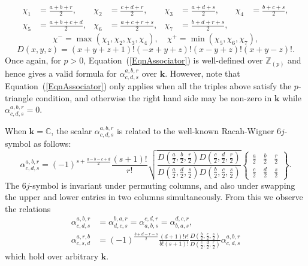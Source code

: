 \documentclass[11pt,a4paper,reqno]{amsart}
\theoremstyle{definition}
\newcommand{\bk}{\mathbf{k}}
\numberwithin{equation}{section}
\newcommand{\mZ}{\mathbb{Z}}
\newcommand{\mC}{\mathbb{C}}
\begin{document}
\begin{align*}
\chi_1&=\frac{a+b+r}2,&\chi_2&=\frac{c+d+r}2,&\chi_3&=\frac{a+d+s}2,&\chi_4&=\frac{b+c+s}2,\\
\chi_5&=\frac{a+b+c+d}2,&\chi_6&=\frac{a+c+r+s}2,&\chi_7&=\frac{b+d+r+s}2,
\end{align*}
\[\chi^-=\max(\chi_1,\chi_2,\chi_3,\chi_4),\quad\chi^+=\min(\chi_5,\chi_6,\chi_7),\]
\[D(x,y,z)=(x+y+z+1)!(-x+y+z)!(x-y+z)!(x+y-z)!.\]
Once again, for $p>0$, Equation~(\ref{EqnAssociator}) is well-defined over $\mZ_{(p)}$ and hence gives a valid formula for $\alpha^{a,b,r}_{c,d,s}$ over $\bk$. However, note that Equation~(\ref{EqnAssociator}) only applies when all the triples above satisfy the $p$-triangle condition, and otherwise the right hand side may be non-zero in $\bk$ while $\alpha^{a,b,r}_{c,d,s}=0$.

When $\bk=\mC$, the scalar $\alpha^{a,b,r}_{c,d,s}$ is related to the well-known Racah-Wigner $6j$-symbol as follows:
\begin{equation}\label{Eqn6j}
\alpha^{a,b,r}_{c,d,s}=(-1)^{s+\frac{a-b-c+d}2}\frac{(s+1)!}{r!}\sqrt{\frac{D(\frac a2,\frac b2,\frac r2)D(\frac c2,\frac d2,\frac r2)}{D(\frac a2,\frac d2,\frac s2)D(\frac b2,\frac c2,\frac s2)}}\left\{\begin{matrix}\frac a2&\frac b2&\frac r2\\\frac c2&\frac d2&\frac s2\end{matrix}\right\}.
\end{equation}
The $6j$-symbol is invariant under permuting columns, and also under swapping the upper and lower entries in two columns simultaneously. From this we observe the relations
\begin{equation}\label{EqnPerms}
\begin{split}
\alpha^{a,b,r}_{c,d,s}&=\alpha^{b,a,r}_{d,c,s}=\alpha^{c,d,r}_{a,b,s}=\alpha^{d,c,r}_{b,a,s},\\
\alpha^{a,r,b}_{c,s,d}&=(-1)^{\frac{b+d-r-s}2}\frac{(d+1)!r!}{b!(s+1)!}\frac{D(\frac b2,\frac c2,\frac s2)}{D(\frac c2,\frac d2,\frac r2)}\alpha^{a,b,r}_{c,d,s}
\end{split}
\end{equation}
which hold over arbitrary $\bk$.
\end{document}
